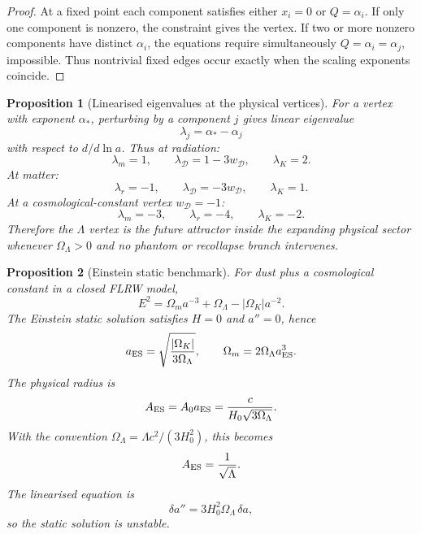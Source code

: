 \documentclass[
  aps,
  prd,
  reprint,
  superscriptaddress,
  nofootinbib,
  floatfix,
  longbibliography
]{revtex4-2}
\newtheorem{proposition}{Proposition}
\newcommand{\D}{\mathcal D}
\begin{document}
\begin{proof}
At a fixed point each component satisfies either \(x_i=0\) or \(Q=\alpha_i\).
If only one component is nonzero, the constraint gives the vertex.  If two or
more nonzero components have distinct \(\alpha_i\), the equations require
simultaneously \(Q=\alpha_i=\alpha_j\), impossible.  Thus nontrivial fixed
edges occur exactly when the scaling exponents coincide.
\end{proof}

\begin{proposition}[Linearised eigenvalues at the physical vertices]
\label{prop:eigs}
For a vertex with exponent \(\alpha_*\), perturbing by a component \(j\) gives
linear eigenvalue
\begin{equation}
  \lambda_j=\alpha_*-\alpha_j
  \label{eq:eig_general}
\end{equation}
with respect to \(d/d\ln a\).  Thus at radiation:
\[
  \lambda_m=1,\qquad \lambda_\D=1-3w_\D,\qquad \lambda_K=2.
\]
At matter:
\[
  \lambda_r=-1,\qquad \lambda_\D=-3w_\D,\qquad \lambda_K=1.
\]
At a cosmological-constant vertex \(w_\D=-1\):
\[
  \lambda_m=-3,\qquad \lambda_r=-4,\qquad \lambda_K=-2.
\]
Therefore the \(\Lambda\) vertex is the future attractor inside the expanding
physical sector whenever \(\Omega_\Lambda>0\) and no phantom or recollapse branch
intervenes.
\end{proposition}

\begin{proposition}[Einstein static benchmark]
\label{prop:ES}
For dust plus a cosmological constant in a closed FLRW model,
\[
  E^2=\Omega_m a^{-3}+\Omega_\Lambda-|\Omega_K|a^{-2}.
\]
The Einstein static solution satisfies \(H=0\) and \(a''=0\), hence
\begin{equation}
  a_{\rm ES}=\sqrt{\frac{|\Omega_K|}{3\Omega_\Lambda}},
  \qquad
  \Omega_m=2\Omega_\Lambda a_{\rm ES}^3 .
  \label{eq:ES}
\end{equation}
The physical radius is
\begin{equation}
  A_{\rm ES}=A_0a_{\rm ES}=\frac{c}{H_0\sqrt{3\Omega_\Lambda}}.
  \label{eq:AES}
\end{equation}
With the convention \(\Omega_\Lambda=\Lambda c^2/(3H_0^2)\), this becomes
\begin{equation}
  A_{\rm ES}=\frac{1}{\sqrt{\Lambda}}.
\end{equation}
The linearised equation is
\begin{equation}
  \delta a''=3H_0^2\Omega_\Lambda\,\delta a,
\end{equation}
so the static solution is unstable.
\end{proposition}
\end{document}

